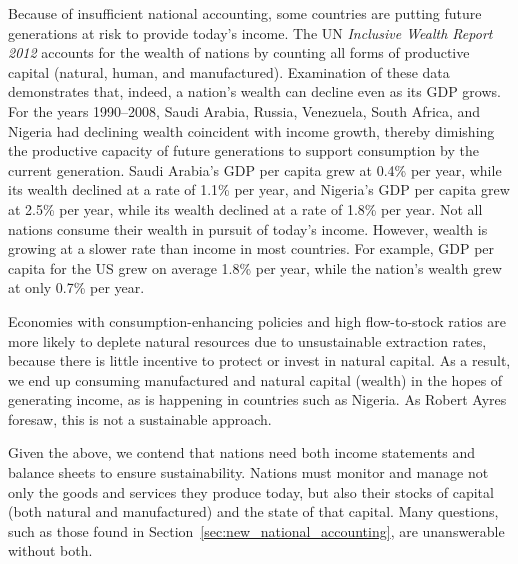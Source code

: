 Because of insufficient national accounting, some
countries are putting future
generations at risk to provide today's income. 
The UN \emph{Inclusive Wealth Report 2012}
accounts for the wealth of nations by counting all forms of productive capital 
(natural, human, and manufactured).\cite{IWR2012}  
Examination of these data demonstrates that, indeed, 
a nation's wealth can decline even as its GDP grows. 
For the years 1990--2008, Saudi Arabia, Russia, Venezuela, South Africa, and Nigeria 
had declining wealth coincident with income growth,
thereby dimishing the productive capacity of future generations
to support consumption by the current generation.
Saudi Arabia's GDP per capita grew at 0.4\% per year, 
while its wealth declined at a rate of 1.1\% per year, 
and Nigeria's GDP per capita grew at 2.5\% per year, 
while its wealth declined at a rate of 1.8\% per year.
Not all nations consume their wealth in pursuit of today's income. 
However, wealth is growing at a slower rate than income
in most countries.
For example, GDP per capita for the US grew on average 1.8\% per year, 
while the nation's wealth grew at only 0.7\% per year.\cite[p.~44]{IWR2012}

Economies with consumption-enhancing policies and high flow-to-stock ratios
are more likely to deplete natural resources due to unsustainable extraction rates, 
because there is little incentive to protect or invest in natural capital. 
As a result, we end up consuming manufactured and natural capital (wealth) 
in the hopes of generating income, as is happening in 
countries such as Nigeria. 
As Robert Ayres foresaw, this is not 
a sustainable approach.

Given the above, we contend that nations need both 
income statements and
balance sheets
to ensure sustainability. 
Nations must monitor and manage not only the goods and services they produce today, 
but also their stocks of capital (both natural and manufactured)
and the state of that capital. 
Many questions, such as those found in Section~\ref{sec:new_national_accounting},
are unanswerable without both.


